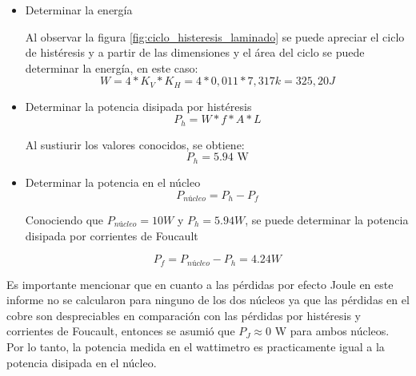 \begin{itemize}
    \begin{equation}
        K_H = \frac{(300 vueltas)( 40 mV)}{(5 m\Omega)(0,328 m)} = 7,317 k A/m.div
    \end{equation}

    \item Determinar la energía
    
    Al observar la figura \ref{fig:ciclo_histeresis_laminado} se puede apreciar el ciclo de histéresis y a partir de las dimensiones y el área del ciclo se puede determinar la energía, en este caso:
    \begin{equation}
    W = 4 * K_V * K_H = 4 * 0,011 * 7,317 k = 325,20 J
    \end{equation}

    \item Determinar la potencia disipada por histéresis
    \begin{equation}
        P_h= W * f * A * L
    \end{equation}

    Al sustiurir los valores conocidos, se obtiene:
    $$P_h = 5.94 \text{ W}$$

    \item Determinar la potencia en el núcleo
    \begin{equation}
        P_{núcleo} = P_h - P_f
    \end{equation}

    Conociendo que $P_{núcleo} = 10 W$ y $P_h = 5.94 W$, se puede determinar la potencia disipada por corrientes de Foucault

    \begin{equation}
        P_f = P_{núcleo} - P_h = 4.24 W
    \end{equation}

\end{itemize}
Es importante mencionar que en cuanto a las pérdidas por efecto Joule
en este informe no se calcularon para ninguno de los dos núcleos ya que las pérdidas 
en el cobre son despreciables en comparación con las pérdidas por histéresis y corrientes de Foucault,
entonces se asumió que $P_J \approx 0$ W para ambos núcleos. Por lo tanto, la potencia medida en el wattimetro es
practicamente igual a la potencia disipada en el núcleo.

